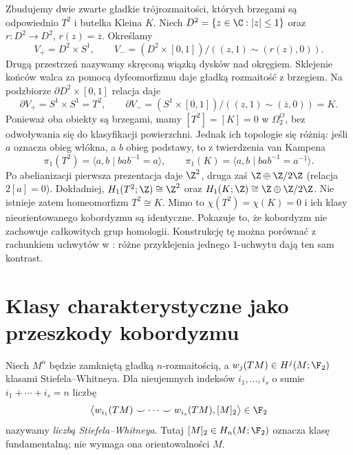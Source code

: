 \begin{przyklad}
\label{prz:bordism-torus-klein-24}
Zbudujemy dwie zwarte gładkie trójrozmaitości, których brzegami są odpowiednio
$T^2$ i butelka Kleina $K$. Niech $D^2=\{z\in\C:|z|\le1\}$ oraz
$r:D^2\to D^2$, $r(z)=\overline z$. Określamy
\[
 V_+=D^2\times S^1,\qquad
 V_-=(D^2\times[0,1])/((z,1)\sim(r(z),0)).
\]
Drugą przestrzeń nazywamy skręconą wiązką dysków nad okręgiem.
Sklejenie końców walca za pomocą dyfeomorfizmu daje gładką
rozmaitość z brzegiem. Na podzbiorze $\partial D^2\times[0,1]$
relacja daje
\[
 \partial V_+=S^1\times S^1=T^2,\qquad
 \partial V_-=(S^1\times[0,1])/((z,1)\sim(\overline z,0))=K.
\]
Ponieważ oba obiekty są brzegami, mamy $[T^2]=[K]=0$
w $\Omega_2^O$, bez odwoływania się do klasyfikacji powierzchni.
Jednak ich topologie się różnią: jeśli $a$ oznacza obieg włókna,
a $b$ obieg podstawy, to z twierdzenia van Kampena
\[
 \pi_1(T^2)=\langle a,b\mid bab^{-1}=a\rangle,\qquad
 \pi_1(K)=\langle a,b\mid bab^{-1}=a^{-1}\rangle.
\]
Po abelianizacji pierwsza prezentacja daje $\Z^2$, druga zaś
$\Z\oplus\Z/2\Z$ (relacja $2[a]=0$). Dokładniej,
$H_1(T^2;\Z)\cong\Z^2$ oraz
$H_1(K;\Z)\cong\Z\oplus\Z/2\Z$. Nie istnieje zatem homeomorfizm
$T^2\cong K$. Mimo to $\chi(T^2)=\chi(K)=0$ i ich klasy
nieorientowanego kobordyzmu są identyczne. Pokazuje to, że
kobordyzm nie zachowuje całkowitych grup homologii.
Konstrukcję tę można porównać z rachunkiem uchwytów w
:
różne przyklejenia jednego $1$-uchwytu dają ten sam kontrast.
\end{przyklad}

\section{Klasy charakterystyczne jako przeszkody kobordyzmu}
\begin{definicja}
Niech $M^n$ będzie zamkniętą gładką $n$-rozmaitością,
a $w_j(TM)\in H^j(M;\F_2)$ klasami Stiefela--Whitneya.
Dla nieujemnych indeksów $i_1,\ldots,i_s$ o sumie
$i_1+\cdots+i_s=n$ liczbę
\[
\bigl\langle w_{i_1}(TM)\smile\cdots\smile
w_{i_s}(TM),[M]_2\bigr\rangle\in\F_2
\]
nazywamy \emph{liczbą Stiefela--Whitneya}.
Tutaj $[M]_2\in H_n(M;\F_2)$ oznacza klasę fundamentalną;
nie wymaga ona orientowalności $M$.
\end{definicja}

